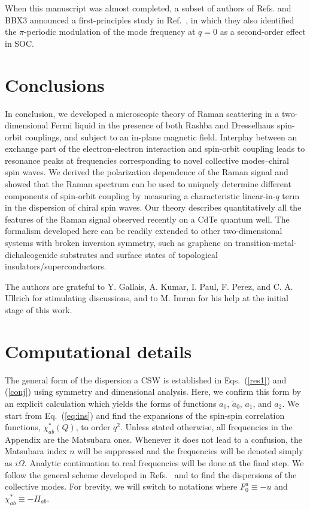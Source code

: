 \documentclass[prb,aps,twocolumn]{revtex4}
\begin{document}
 When this manuscript was almost completed, a
subset of authors of Refs.  and \onlinecite
{BBX3} announced a first-principles study in
Ref.~, in which they also identified the
$\pi$-periodic modulation of the mode frequency at $q=0$ as a
second-order effect in SOC.


\section{Conclusions}\label{sec:con}
In conclusion, we developed a microscopic theory of Raman
scattering in a two-dimensional  Fermi liquid in the presence of
both Rashba and Dresselhaus spin-orbit couplings, and subject to
an in-plane magnetic field. Interplay between an exchange part of
the electron-electron interaction and spin-orbit coupling leads to
resonance peaks at frequencies corresponding to novel collective
modes--chiral spin waves. We derived the polarization dependence
of the Raman signal and showed that the Raman spectrum can be used
to uniquely determine different components of spin-orbit coupling
by measuring a characteristic linear-in-$q$ term in the dispersion
of chiral spin waves. Our theory describes quantitatively all the
features of the Raman signal observed recently on a CdTe quantum
well.\cite{BBX1,BBX2,BBX3} The formalism developed here can be
readily extended to other two-dimensional systems with broken
inversion symmetry, such as graphene on
transition-metal-dichalcogenide substrates and surface states of
topological insulators/superconductors.

\acknowledgements The authors are grateful to Y. Gallais, A.
Kumar, I. Paul, F. Perez, and C. A. Ullrich for stimulating
discussions, and to M. Imran for his help at the initial stage of
this work.
\appendix
\section{Computational details}
The general form of the dispersion a CSW is established in
Eqs.~(\ref{res1}) and (\ref{conj}) using symmetry and dimensional
analysis. Here, we confirm this form by an explicit calculation
which yields the forms of functions $a_0$, $\tilde a_0$, $a_1$,
and $a_2$. We start from Eq.~(\ref{eq:ins}) and find the
expansions of the spin-spin correlation functions,
$\chi^*_{ab}(Q)$, to order $q^2$. Unless stated otherwise, all
frequencies in the Appendix are the Matsubara ones. Whenever it
does not lead to a confusion, the Matsubara  index $n$ will be
suppressed and the frequencies will be denoted simply as
$i\Omega$. Analytic continuation to real frequencies will be done
at the final step. We follow the general scheme developed in
Refs.~ and  to find the
dispersions of the collective modes. For brevity, we will switch
to notations where $F_0^a\equiv-u$ and
{$\chi^*_{ab}\equiv-\Pi_{ab}$}.
\end{document}
